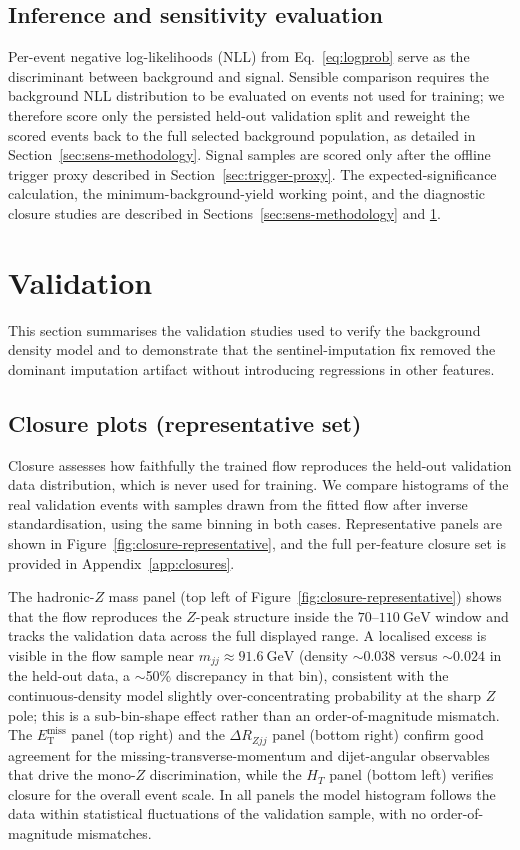 \documentclass[11pt,a4paper,twocolumn]{article}
\newcommand{\GeV}{\text{GeV}}
\newcommand{\MET}{\ensuremath{E_{\mathrm{T}}^{\mathrm{miss}}}}
\begin{document}
\subsection{Inference and sensitivity evaluation}

Per-event negative log-likelihoods (NLL) from Eq.~\eqref{eq:logprob} serve
as the discriminant between background and signal. Sensible comparison
requires the background NLL distribution to be evaluated on events not used
for training; we therefore score only the persisted held-out validation
split and reweight the scored events back to the full selected background
population, as detailed in Section~\ref{sec:sens-methodology}. Signal
samples are scored only after the offline trigger proxy described in
Section~\ref{sec:trigger-proxy}. The expected-significance calculation,
the minimum-background-yield working point, and the diagnostic closure
studies are described in Sections~\ref{sec:sens-methodology} and
\ref{sec:validation}.

\section{Validation}
\label{sec:validation}

This section summarises the validation studies used to verify the background
density model and to demonstrate that the sentinel-imputation fix removed
the dominant imputation artifact without introducing regressions in other
features.

\subsection{Closure plots (representative set)}

Closure assesses how faithfully the trained flow reproduces the held-out
validation data distribution, which is never used for training. We compare
histograms of the real validation events with samples drawn from the fitted
flow after inverse standardisation, using the same binning in both cases.
Representative panels are shown in Figure~\ref{fig:closure-representative},
and the full per-feature closure set is provided in
Appendix~\ref{app:closures}.

The hadronic-$Z$ mass panel (top left of
Figure~\ref{fig:closure-representative}) shows that the flow reproduces the
$Z$-peak structure inside the $70$--$110~\GeV$ window and tracks the
validation data across the full displayed range. A localised excess is
visible in the flow sample near $m_{jj}\approx 91.6~\GeV$ (density
$\sim\!0.038$ versus $\sim\!0.024$ in the held-out data, a $\sim$50\%
discrepancy in that bin), consistent with the continuous-density model
slightly over-concentrating probability at the sharp $Z$ pole; this is a
sub-bin-shape effect rather than an order-of-magnitude mismatch. The \MET{}
panel (top right) and the $\Delta R_{Zjj}$ panel (bottom right) confirm good
agreement for the missing-transverse-momentum and dijet-angular observables
that drive the mono-$Z$ discrimination, while the $H_T$ panel (bottom left)
verifies closure for the overall event scale. In all panels the model
histogram follows the data within statistical fluctuations of the validation
sample, with no order-of-magnitude mismatches.
\end{document}

